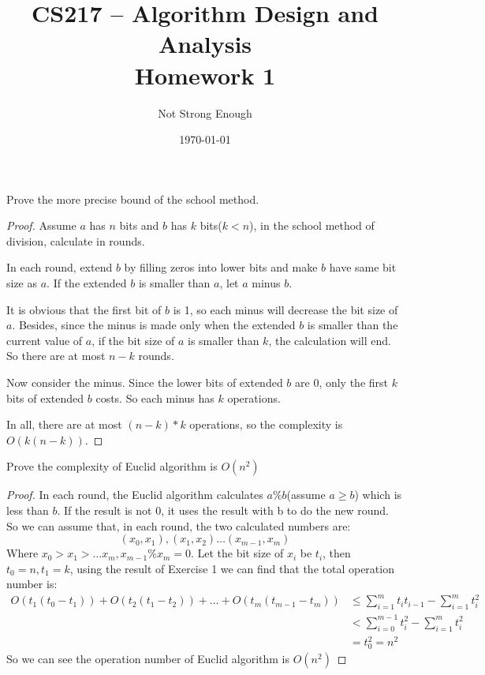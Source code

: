 \documentclass[UTF8, a4paper, linespread=1.5]{article}
\title{CS217 -- Algorithm Design and Analysis \\ Homework 1}
\date{\today}
\author{Not Strong Enough}
\begin{document}
\maketitle

\begin{thm}{}{}
    Prove the more precise bound of the school method.
\end{thm}
\begin{proof}
	Assume $a$ has $n$ bits and $b$ has $k$ bits($k < n$), in the school method of division, 
	calculate in rounds. 
	
	In each round, extend $b$ by filling zeros into lower bits and make $b$ have same bit size as $a$. 
	If the extended $b$ is smaller than $a$, let $a$ minus $b$. 
	
	It is obvious that the first bit of $b$ is 1, so each minus will decrease the bit size of $a$. 
	Besides, since the minus is made only when the extended $b$ is smaller than the current value of $a$, 
	if the bit size of $a$ is smaller than $k$, the calculation will end. 
	So there are at most $n-k$ rounds. 
	
	Now consider the minus. Since the lower bits of extended $b$ are 0, only the first $k$ bits of extended $b$ 
	costs. So each minus has $k$ operations. 
	
	In all, there are at most $(n-k)*k$ operations, so the complexity is $O(k(n-k))$. 
\end{proof}

\newpage
\begin{thm}{}{}
    Prove the complexity of Euclid algorithm is $O(n^2)$
\end{thm}
\begin{proof}
	In each round, the Euclid algorithm calculates $a\%b$(assume $a\geq b$) which is less than $b$. 
	If the result is not 0, it uses the result with b to do the new round. So we can assume that, in each round, 
	the two calculated numbers are: 
	$$(x_0, x_1), (x_1, x_2)\dots (x_{m-1}, x_m)$$
	Where $x_0>x_1>\dots x_m, x_{m-1}\%x_m=0$. 
	Let the bit size of $x_i$ be $t_i$, then $t_0=n, t_1=k$, 
	using the result of Exercise 1 we can find that the total operation number is: 
	\begin{align}
	O(t_1(t_0-t_1))+O(t_2(t_1-t_2))+\dots + O(t_m(t_{m-1}-t_m)) &\leq\sum_{i=1}^m t_i t_{i-1}-\sum_{i=1}^m t_i^2\\
	&<\sum_{i=0}^{m-1} t_i^2 -\sum_{i=1}^m t_i^2\\
	&=t_0^2=n^2
	\end{align}
	So we can see the operation number of Euclid algorithm is $O(n^2)$
\end{proof}
\end{document}

